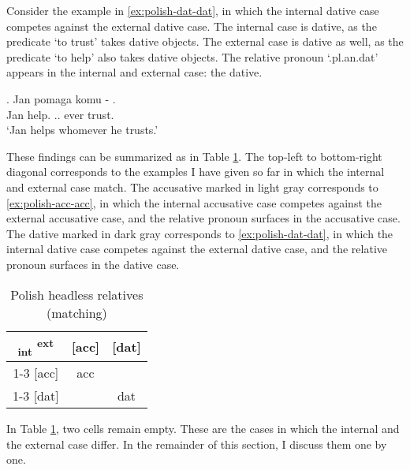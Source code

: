 Consider the example in \ref{ex:polish-dat-dat}, in which the internal dative case competes against the external dative case.
The internal case is dative, as the predicate  `to trust' takes dative objects.
The external case is dative as well, as the predicate  `to help' also takes dative objects.
The relative pronoun  `.\ac{pl}.\ac{an}.\ac{dat}' appears in the internal and external case: the dative.

\exg. Jan pomaga komu - .\\
 Jan help.\scsub{[dat]} .. ever trust.\scsub{[dat]}\\
 `Jan helps whomever he trusts.' \label{ex:polish-dat-dat}

These findings can be summarized as in Table \ref{tbl:summary-polish-matching}. The top-left to bottom-right diagonal corresponds to the examples I have given so far in which the internal and external case match. The accusative marked in light gray corresponds to \ref{ex:polish-acc-acc}, in which the internal accusative case competes against the external accusative case, and the relative pronoun surfaces in the accusative case. The dative marked in dark gray corresponds to \ref{ex:polish-dat-dat}, in which the internal dative case competes against the external dative case, and the relative pronoun surfaces in the dative case.

\begin{table}[ht]
 \center
 \caption{Polish headless relatives (matching)}
 \begin{tabular}{c|c|c}
   \toprule
   \textsubscript{\ac{int}} \textsuperscript{\ac{ext}}
          & [\ac{acc}]
          & [\ac{dat}]
          \\ \cmidrule{1-3}
      [\ac{acc}]
          & \cellcolor{LG}\ac{acc}
          &
          \\ \cmidrule{1-3}
      [\ac{dat}]
          &
          & \cellcolor{DG}\ac{dat}
          \\
    \bottomrule
 \end{tabular}
   \label{tbl:summary-polish-matching}
\end{table}

In Table \ref{tbl:summary-polish-matching}, two cells remain empty. These are the cases in which the internal and the external case differ. In the remainder of this section, I discuss them one by one.

